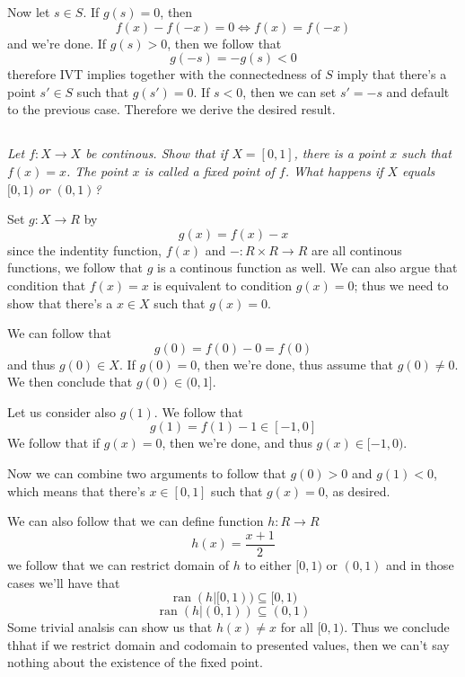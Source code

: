 \documentclass[11pt,oneside,titlepage]{book}
\DeclareMathOperator \lra {\Leftrightarrow}
\DeclareMathOperator \ran {ran}
\begin{document}
Now let $s \in S$. If $g(s) = 0$, then
$$f(x) - f(-x) = 0 \lra f(x) = f(-x)$$
and we're done. If $g(s) > 0$, then we follow that
$$g(-s) = -g(s) < 0$$
therefore IVT implies together with the connectedness of $S$ imply that there's a point $s' \in S$
such that $g(s') = 0$. If $s < 0$, then we can set $s' = -s$ and default to the previous case.
Therefore we derive the desired result.

\subsection{}

\textit{Let $f: X \to X$ be continous. Show that if $X = [0, 1]$, there is a point $x$
  such that $f(x) = x$. The point $x$ is called a fixed point of $f$. What happens if $X$
  equals $[0, 1)$ or $(0, 1)$?}

Set $g: X \to R$ by
$$g(x) = f(x) - x$$
since the indentity function, $f(x)$ and $-: R \times R \to R$ are all continous functions,
we follow that
$g$ is a continous function as well. We can also argue
that condition that $f(x) = x$ is equivalent to condition $g(x) = 0$; thus we
need to show that there's a $x \in X$ such that $g(x) = 0$.

We can follow that
$$g(0) = f(0) - 0 = f(0)$$
and thus $g(0) \in X$. If $g(0) = 0$, then we're done, thus assume that $g(0) \neq 0$.
We then conclude that $g(0) \in (0, 1]$.

Let us consider also $g(1)$. We follow that
$$g(1) = f(1) - 1 \in [-1, 0]$$
We follow that if $g(x) = 0$, then we're done, and thus $g(x) \in [-1, 0)$.

Now we can combine two arguments to follow that $g(0) > 0$ and $g(1) < 0$, which means that
there's $x \in [0, 1]$ such that $g(x) = 0$, as desired.

We can also follow that we can define function $h: R \to R$
$$h(x) = \frac{x + 1}{2}$$
we follow that we can restrict domain of $h$ to either $[0, 1)$ or $(0, 1)$ and in those
cases we'll have that
$$\ran(h|[0, 1)) \subseteq [0, 1)$$
$$\ran(h|(0, 1)) \subseteq (0, 1)$$
Some trivial analsis can show us that $h(x) \neq x$ for all $[0, 1)$. Thus we conclude thhat
if we restrict domain and codomain to presented values, then we can't say nothing about the
existence of the fixed point.


\subsection{}
\end{document}

